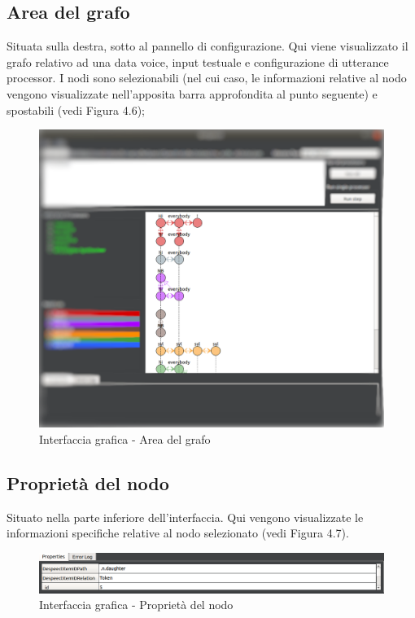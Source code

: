 \documentclass[openany,12pt,a4paper]{report}
\begin{document}
 	\subsection{Area del grafo}
 	Situata sulla destra, sotto al pannello di configurazione. Qui viene visualizzato il grafo relativo ad una data voice, input testuale e configurazione di utterance processor. I nodi sono selezionabili (nel cui caso, le informazioni relative al nodo vengono visualizzate nell'apposita barra approfondita al punto seguente) e spostabili (vedi Figura 4.6);
 		\begin{figure}[H]
 			
 			\centering
 			
 				\includegraphics[scale=0.3]{./img/graph-area}
 			
 			\caption{Interfaccia grafica - Area del grafo}
 			
 		\end{figure}
 	
 	\subsection{Proprietà del nodo}
 	Situato nella parte inferiore dell'interfaccia. Qui vengono visualizzate le informazioni specifiche relative al nodo selezionato (vedi Figura 4.7).
 		\begin{figure}[H]
 			
 			\centering
 			
 				\includegraphics[width=\textwidth]{./img/node-properties}
 			
 			\caption{Interfaccia grafica - Proprietà del nodo}
 			
 		\end{figure}
	
\end{document}
